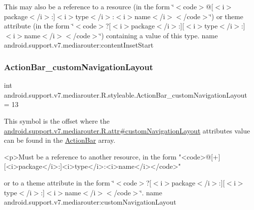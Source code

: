 This may also be a reference to a resource (in the form \char`\"{}$<$code$>$@\mbox{[}$<$i$>$package$<$/i$>$\+:\mbox{]}$<$i$>$type$<$/i$>$\+:$<$i$>$name$<$/i$>$$<$/code$>$\char`\"{}) or theme attribute (in the form \char`\"{}$<$code$>$?\mbox{[}$<$i$>$package$<$/i$>$\+:\mbox{]}\mbox{[}$<$i$>$type$<$/i$>$\+:\mbox{]}$<$i$>$name$<$/i$>$$<$/code$>$\char`\"{}) containing a value of this type.  name android.\+support.\+v7.\+mediarouter\+:content\+Inset\+Start \mbox{\label{classandroid_1_1support_1_1v7_1_1mediarouter_1_1R_1_1styleable_a5c3f8aaa133e06d0779223802c38aa49}} 
\subsubsection{\texorpdfstring{Action\+Bar\+\_\+custom\+Navigation\+Layout}{ActionBar\_customNavigationLayout}}
{\footnotesize\ttfamily int android.\+support.\+v7.\+mediarouter.\+R.\+styleable.\+Action\+Bar\+\_\+custom\+Navigation\+Layout = 13\hspace{0.3cm}{\ttfamily [static]}}

This symbol is the offset where the \hyperlink{classandroid_1_1support_1_1v7_1_1mediarouter_1_1R_1_1attr_a3b3733a1976437f986f9b8cc4c34a6a5}{android.\+support.\+v7.\+mediarouter.\+R.\+attr\#custom\+Navigation\+Layout} attribute\textquotesingle{}s value can be found in the \hyperlink{classandroid_1_1support_1_1v7_1_1mediarouter_1_1R_1_1styleable_adc4d3c0d096085367f12d025007aa53f}{Action\+Bar} array.

\begin{DoxyVerb}      <p>Must be a reference to another resource, in the form "<code>@[+][<i>package</i>:]<i>type</i>:<i>name</i></code>"
\end{DoxyVerb}
 or to a theme attribute in the form \char`\"{}$<$code$>$?\mbox{[}$<$i$>$package$<$/i$>$\+:\mbox{]}\mbox{[}$<$i$>$type$<$/i$>$\+:\mbox{]}$<$i$>$name$<$/i$>$$<$/code$>$\char`\"{}.  name android.\+support.\+v7.\+mediarouter\+:custom\+Navigation\+Layout \mbox{\label{classandroid_1_1support_1_1v7_1_1mediarouter_1_1R_1_1styleable_a2da5ac029ba0fe946502ac4dea17263f}} 
